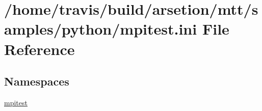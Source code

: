 \hypertarget{mpitest_8ini}{\section{/home/travis/build/arsetion/mtt/samples/python/mpitest.ini File Reference}
\label{mpitest_8ini}
}
\subsection*{Namespaces}
\begin{DoxyCompactItemize}
\item 
\hyperlink{namespacempitest}{mpitest}
\end{DoxyCompactItemize}
